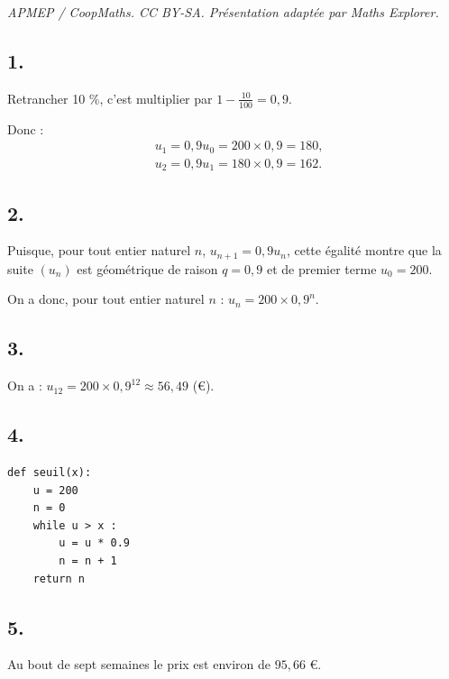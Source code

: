 \documentclass[10pt]{article}
\begin{document}
\noindent\textit{APMEP / CoopMaths. CC BY-SA. Présentation adaptée par Maths Explorer.}\par\medskip
\subsection*{1.}

Retrancher 10 \%, c'est multiplier par \(1 - \frac{10}{100} = 0{,}9\).

Donc :
\begin{align*}
&u_1 = 0{,}9 u_0 = 200 \times 0{,}9 = 180, \\
&u_2 = 0{,}9 u_1 = 180 \times 0{,}9 = 162.
\end{align*}

\subsection*{2.}

Puisque, pour tout entier naturel \(n\), \(u_{n+1} = 0{,}9 u_n\), cette égalité montre que la suite \((u_n)\) est géométrique de raison \(q = 0{,}9\) et de premier terme \(u_0 = 200\).

On a donc, pour tout entier naturel \(n\) : \(u_n = 200 \times 0{,}9^n\).

\subsection*{3.}

On a : \(u_{12} = 200 \times 0{,}9^{12} \approx 56{,}49\) (€).

\subsection*{4.}

\begin{center}
\begin{lstlisting}[style=python]
def seuil(x):
    u = 200
    n = 0
    while u > x :
        u = u * 0.9
        n = n + 1
    return n
\end{lstlisting}
\end{center}

\subsection*{5.}

Au bout de sept semaines le prix est environ de \(95{,}66\) €.
\end{document}
